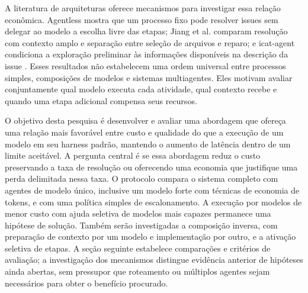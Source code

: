 A literatura de arquiteturas oferece mecanismos para investigar essa relação econômica. Agentless mostra que um processo fixo pode resolver issues sem delegar ao modelo a escolha livre das etapas; Jiang et al. comparam resolução com contexto amplo e separação entre seleção de arquivos e reparo; e icat-agent condiciona a exploração preliminar às informações disponíveis na descrição da issue \cite{Xia2024Agentless,Jiang2025LCLM,Chen2026IcatAgent}. Esses resultados não estabelecem uma ordem universal entre processos simples, composições de modelos e sistemas multiagentes. Eles motivam avaliar conjuntamente qual modelo executa cada atividade, qual contexto recebe e quando uma etapa adicional compensa seus recursos.

O objetivo desta pesquisa é desenvolver e avaliar uma abordagem que ofereça uma relação mais favorável entre custo e qualidade do que a execução de um modelo em seu harness padrão, mantendo o aumento de latência dentro de um limite aceitável. A pergunta central é se essa abordagem reduz o custo preservando a taxa de resolução ou oferecendo uma economia que justifique uma perda delimitada nessa taxa. O protocolo compara o sistema completo com agentes de modelo único, inclusive um modelo forte com técnicas de economia de tokens, e com uma política simples de escalonamento. A execução por modelos de menor custo com ajuda seletiva de modelos mais capazes permanece uma hipótese de solução. Também serão investigadas a composição inversa, com preparação de contexto por um modelo e implementação por outro, e a ativação seletiva de etapas. A seção seguinte estabelece comparações e critérios de avaliação; a investigação dos mecanismos distingue evidência anterior de hipóteses ainda abertas, sem pressupor que roteamento ou múltiplos agentes sejam necessários para obter o benefício procurado.
